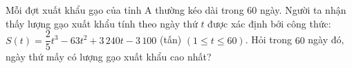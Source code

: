 \begin{bt}%
	Mỗi đợt xuất khẩu gạo của tỉnh A thường kéo dài trong $60$ ngày. Người ta nhận thấy lượng gạo xuất khẩu tính theo ngày thứ $t$ được xác định bởi công thức: $S(t)=\dfrac{2}{5}t^3-63t^2+3\,240t-3\,100$ (tấn) $(1 \le t \le 60)$. Hỏi trong $60$ ngày đó, ngày thứ mấy có lượng gạo xuất khẩu cao nhất?
\end{bt}

